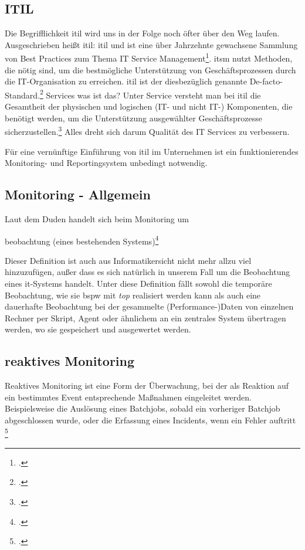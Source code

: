 \documentclass[12pt,a4paper,parskip,listof=totoc,bibliography=totoc]{scrreprt}
\begin{document}
	\subsection{ITIL}
	Die Begrifflichkeit \acrshort{itil} wird uns in der Folge noch öfter über den Weg laufen. Ausgeschrieben heißt \acrshort{itil}: \acrlong{itil} und ist eine über Jahrzehnte gewachsene Sammlung von Best Practices zum Thema IT Service Management\footcite{ebelitilv3}. \glqq\acrfull{itsm} nutzt Methoden, die nötig sind, um die bestmögliche Unterstützung von Geschäftsprozessen durch die IT-Organisation zu erreichen. \acrshort{itil} ist der diesbezüglich genannte De-facto-Standard.\grqq\footcite[S. 27]{ebelitilv3} 
	Services was ist das? Unter Service versteht man bei \acrshort{itil} die Gesamtheit der physischen und logischen (IT- und nicht IT-) Komponenten, die benötigt werden, um die Unterstützung ausgewählter Geschäftsprozesse sicherzustellen.\footcite{sommeritservicemgmt}
	Alles dreht sich darum Qualität des IT Services zu verbessern.
	
	
	Für eine vernünftige Einführung von \acrshort{itil} im Unternehmen ist ein funktionierendes Monitoring- und Reportingsystem unbedingt notwendig.
	\subsection{Monitoring - Allgemein}
	Laut dem Duden handelt sich beim Monitoring um
	\begin{center}
		\glqq[Dauer]beobachtung (eines bestehenden Systems)\grqq\footcite[S. 701; Stichwort Monitoring]{duden}
	\end{center}
	Dieser Definition ist auch aus Informatikersicht nicht mehr allzu viel hinzuzufügen, außer dass es sich natürlich in unserem Fall um die Beobachtung eines \acrshort{it}-Systems handelt. Unter diese Definition fällt sowohl die temporäre Beobachtung, wie sie \acrlong{bspw} mit \textit{top} realisiert werden kann als auch eine dauerhafte Beobachtung bei der gesammelte (Performance-)Daten von einzelnen Rechner per Skript, Agent oder ähnlichem an ein zentrales System übertragen werden, wo sie gespeichert und ausgewertet werden.
	
	\subsection{reaktives Monitoring}
	\glqq Reaktives Monitoring ist eine Form der Überwachung, bei der als Reaktion auf ein bestimmtes Event entsprechende Maßnahmen eingeleitet werden. Beispielsweise die Auslösung eines Batchjobs, sobald ein vorheriger Batchjob abgeschlossen wurde, oder die Erfassung eines Incidents, wenn ein Fehler auftritt\grqq
	\footcite[S. 511]{ebelitilv3}
	
\end{document}
